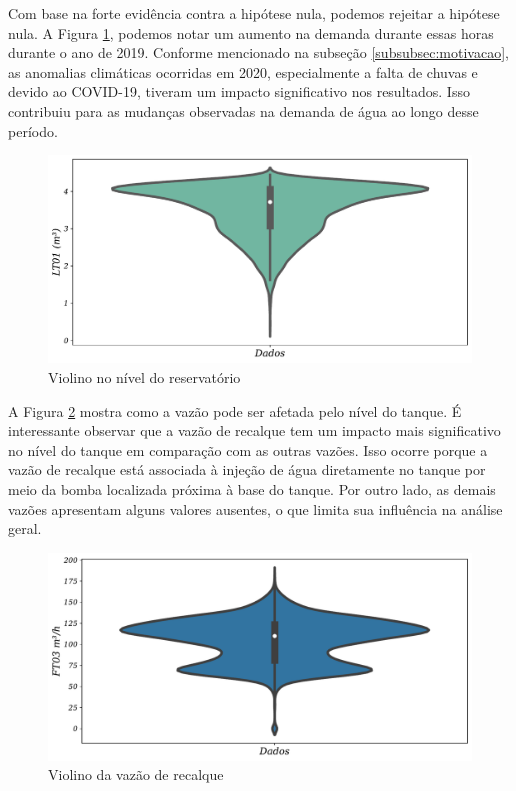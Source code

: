 Com base na forte evidência contra a hipótese nula, podemos rejeitar a hipótese nula. A Figura \ref{fig:hist}, podemos notar um aumento na demanda durante essas horas durante o ano de 2019.
Conforme mencionado na subseção \ref{subsubsec:motivacao}, as anomalias climáticas ocorridas em 2020, especialmente a falta de chuvas e devido ao COVID-19, tiveram um impacto significativo nos resultados. Isso contribuiu para as mudanças observadas na demanda de água ao longo desse período.

\begin{figure}[!htb]
	\centering
	\caption{Violino no nível do reservatório}
	\label{fig:hist}
	\includegraphics[width=0.7\linewidth]{Resultados/Figuras/viol}
	
	
\end{figure}





A Figura \ref{fig:ft03} mostra como a vazão pode ser afetada pelo nível do tanque. É interessante observar que a vazão de recalque tem um impacto mais significativo no nível do tanque em comparação com as outras vazões. Isso ocorre porque a vazão de recalque está associada à injeção de água diretamente no tanque por meio da bomba localizada próxima à base do tanque. Por outro lado, as demais vazões apresentam alguns valores ausentes, o que limita sua influência na análise geral.	


\begin{figure}[!htb]
	\centering
	\caption{Violino da vazão de recalque}
	\label{fig:ft03}
	\includegraphics[width=0.7\linewidth]{Resultados/Figuras/ft03}
	
	
\end{figure}




